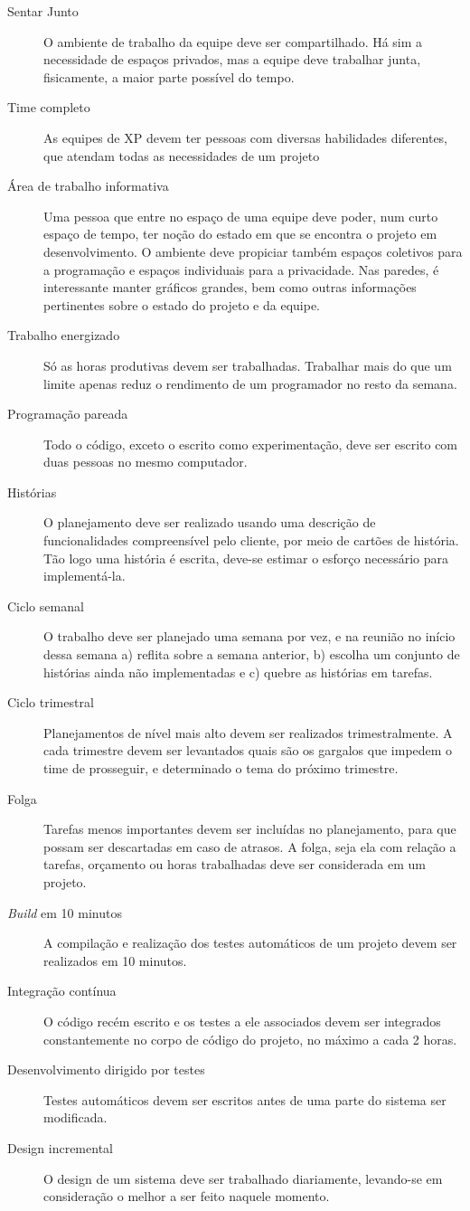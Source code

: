 \documentclass[a4paper,12pt,font=plain,header=plain]{abnt}
\begin{document}
	\begin{description}
		\item[Sentar Junto]
		O ambiente de trabalho da equipe deve ser compartilhado. Há sim a necessidade de espaços privados, mas a equipe deve trabalhar junta, fisicamente, a maior parte possível do tempo.
		\item[Time completo]
		As equipes de XP devem ter pessoas com diversas habilidades diferentes, que atendam todas as necessidades de um projeto
		\item[Área de trabalho informativa]
		Uma pessoa que entre no espaço de uma equipe deve poder, num curto espaço de tempo, ter noção do estado em que se encontra o projeto em desenvolvimento. O ambiente deve propiciar também espaços coletivos para a programação e espaços individuais para a privacidade. Nas paredes, é interessante manter gráficos grandes, bem como outras informações pertinentes sobre o estado do projeto e da equipe.
		\item[Trabalho energizado]
		Só as horas produtivas devem ser trabalhadas. Trabalhar mais do que um limite apenas reduz o rendimento de um programador no resto da semana.
		\item[Programação pareada]
		Todo o código, exceto o escrito como experimentação, deve ser escrito com duas pessoas no mesmo computador.
		\item[Histórias]
		O planejamento deve ser realizado usando uma descrição de funcionalidades compreensível pelo cliente, por meio de cartões de história. Tão logo uma história é escrita, deve-se estimar o esforço necessário para implementá-la.
		\item[Ciclo semanal]
		O trabalho deve ser planejado uma semana por vez, e na reunião no início dessa semana a) reflita sobre a semana anterior, b) escolha um conjunto de histórias ainda não implementadas e c) quebre as histórias em tarefas.
		\item[Ciclo trimestral]
		Planejamentos de nível mais alto devem ser realizados trimestralmente. A cada trimestre devem ser levantados quais são os gargalos que impedem o time de prosseguir, e determinado o tema do próximo trimestre.
		\item[Folga]
		Tarefas menos importantes devem ser incluídas no planejamento, para que possam ser descartadas em caso de atrasos. A folga, seja ela com relação a tarefas, orçamento ou horas trabalhadas deve ser considerada em um projeto.
		\item[\textit{Build} em 10 minutos]
		A compilação e realização dos testes automáticos de um projeto devem ser realizados em 10 minutos.
		\item[Integração contínua]
		O código recém escrito e os testes a ele associados devem ser integrados constantemente no corpo de código do projeto, no máximo a cada 2 horas.
		\item[Desenvolvimento dirigido por testes]
		Testes automáticos devem ser escritos antes de uma parte do sistema ser modificada.
		\item[Design incremental]
		O design de um sistema deve ser trabalhado diariamente, levando-se em consideração o melhor a ser feito naquele momento.
	\end{description}
\end{document}
